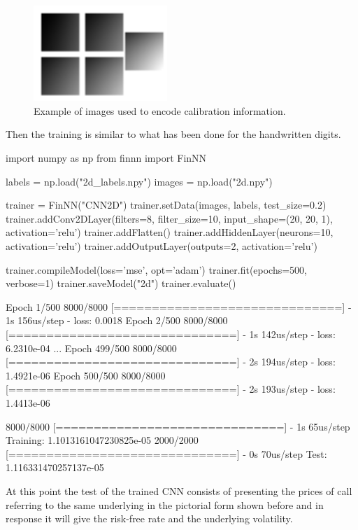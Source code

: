 \begin{figure}[htb]
\centering
\includegraphics[width=0.45\textwidth]{figures/2d_training_images}
	\caption{Example of images used to encode calibration information.}
\label{fig:test_images_calib}
\end{figure}
\noindent
Then the training is similar to what has been done for the handwritten digits.

\begin{ipython}
import numpy as np
from finnn import FinNN

labels = np.load("2d_labels.npy")
images = np.load("2d.npy")

trainer = FinNN("CNN2D")
trainer.setData(images, labels, test_size=0.2)
trainer.addConv2DLayer(filters=8, filter_size=10,
input_shape=(20, 20, 1), activation='relu')
trainer.addFlatten()
trainer.addHiddenLayer(neurons=10, activation='relu')
trainer.addOutputLayer(outputs=2, activation='relu')

trainer.compileModel(loss='mse', opt='adam')
trainer.fit(epochs=500, verbose=1)
trainer.saveModel("2d")
trainer.evaluate()
\end{ipython}
\begin{ioutput}
Epoch 1/500
8000/8000 [==============================] - 1s 156us/step - loss: 0.0018
Epoch 2/500
8000/8000 [==============================] - 1s 142us/step - loss: 6.2310e-04
...
Epoch 499/500
8000/8000 [==============================] - 2s 194us/step - loss: 1.4921e-06
Epoch 500/500
8000/8000 [==============================] - 2s 193us/step - loss: 1.4413e-06

8000/8000 [==============================] - 1s 65us/step
Training: 1.1013161047230825e-05
2000/2000 [==============================] - 0s 70us/step
Test: 1.116331470257137e-05
\end{ioutput}

At this point the test of the trained CNN consists of presenting the prices of call referring to the same underlying in the pictorial form shown before and in response it will give the risk-free rate and the underlying volatility.

